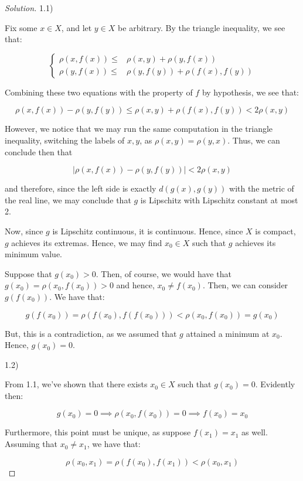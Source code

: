 \documentclass[10pt]{article}
\begin{document}
\begin{proof}[Solution]

1.1)

Fix some $x \in X$, and let $y \in X$ be arbitrary. By the triangle inequality, we see that:

$$ \begin{cases} \rho(x, f(x)) \leq & \rho(x,y) + \rho (y, f(x)) \\ \rho(y, f(x)) \leq & \rho(y, f(y)) + \rho(f(x), f(y)) \end{cases}$$

Combining these two equations with the property of $f$ by hypothesis, we see that:

$$ \rho(x, f(x)) - \rho(y, f(y)) \leq \rho(x,y) + \rho(f(x), f(y)) < 2 \rho(x,y) $$

However, we notice that we may run the same computation in the triangle inequality, switching the labels of $x, y$, as $\rho(x,y) = \rho(y,x)$. Thus, we can conclude then that

$$ | \rho(x, f(x)) - \rho(y, f(y))| < 2 \rho(x,y)$$

and therefore, since the left side is exactly $d(g(x), g(y))$ with the metric of the real line, we may conclude that $g$ is Lipschitz with Lipschitz constant at most 2.

Now, since $g$ is Lipschitz continuous, it is continuous. Hence, since $X$ is compact, $g$ achieves its extremas. Hence, we may find $x_0 \in X$ such that $g$ achieves its minimum value.

Suppose that $g(x_0) > 0$. Then, of course, we would have that $g(x_0) = \rho(x_0, f(x_0)) > 0$ and hence, $x_0 \not = f(x_0)$. Then, we can consider $g(f(x_0))$. We have that:

$$ g(f(x_0)) = \rho(f(x_0), f(f(x_0))) < \rho(x_0, f(x_0)) = g(x_0)$$

But, this is a contradiction, as we assumed that $g$ attained a minimum at $x_0$. Hence, $g(x_0) = 0$.

1.2)

From 1.1, we've shown that there exists $x_0 \in X$ such that $g(x_0) = 0$. Evidently then:

$$ g(x_0) = 0 \implies \rho(x_0, f(x_0)) = 0 \implies f(x_0) = x_0$$

Furthermore, this point must be unique, as suppose $f(x_1)= x_1$ as well. Assuming that $x_0 \not = x_1$, we have that:

$$ \rho(x_0, x_1) = \rho(f(x_0), f(x_1)) < \rho(x_0, x_1) $$


\end{proof}
\end{document}
